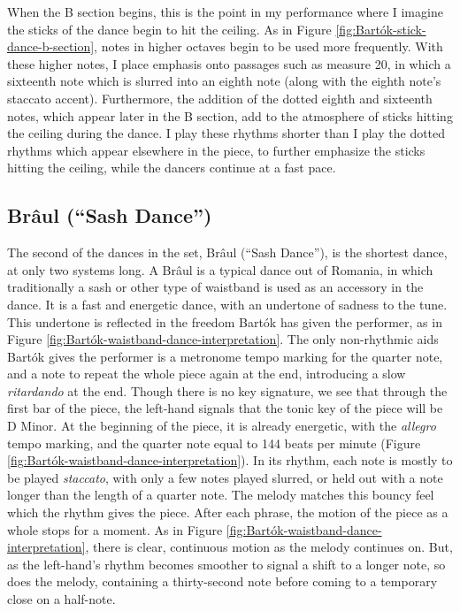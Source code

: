 When the B section begins, this is the point in my performance where I imagine the sticks of the dance begin to hit the ceiling. As in Figure \ref{fig:Bartók-stick-dance-b-section}\autocite{Lung_2016}, notes in higher octaves begin to be used more frequently. With these higher notes, I place emphasis onto passages such as measure 20, in which a sixteenth note which is slurred into an eighth note (along with the eighth note's staccato accent). Furthermore, the addition of the dotted eighth and sixteenth notes, which appear later in the B section, add to the atmosphere of sticks hitting the ceiling during the dance. I play these rhythms shorter than I play the dotted rhythms which appear elsewhere in the piece, to further emphasize the sticks hitting the ceiling, while the dancers continue at a fast pace. 

\subsection{Brâul (``Sash Dance'')}

The second of the dances in the set, Brâul (``Sash Dance''), is the shortest dance, at only two systems long. A Brâul is a typical dance out of Romania, in which traditionally a sash or other type of waistband is used as an accessory in the dance. It is a fast and energetic dance, with an undertone of sadness to the tune. This undertone is reflected in the freedom Bartók has given the performer, as in Figure \ref{fig:Bartók-waistband-dance-interpretation}\autocite{Lung_2016}. The only non-rhythmic aids Bartók gives the performer is a metronome tempo marking for the quarter note, and a note to repeat the whole piece again at the end, introducing a slow \textit{ritardando} at the end. Though there is no key signature, we see that through the first bar of the piece, the left-hand signals that the tonic key of the piece will be D Minor. At the beginning of the piece, it is already energetic, with the \textit{allegro} tempo marking, and the quarter note equal to 144 beats per minute (Figure \ref{fig:Bartók-waistband-dance-interpretation}\autocite{Lung_2016}). In its rhythm, each note is mostly to be played \textit{staccato}, with only a few notes played slurred, or held out with a note longer than the length of a quarter note. The melody matches this bouncy feel which the rhythm gives the piece. After each phrase, the motion of the piece as a whole stops for a moment. As in Figure \ref{fig:Bartók-waistband-dance-interpretation}\autocite{Lung_2016}, there is clear, continuous motion as the melody continues on. But, as the left-hand's rhythm becomes smoother to signal a shift to a longer note, so does the melody, containing a thirty-second note before coming to a temporary close on a half-note. 

